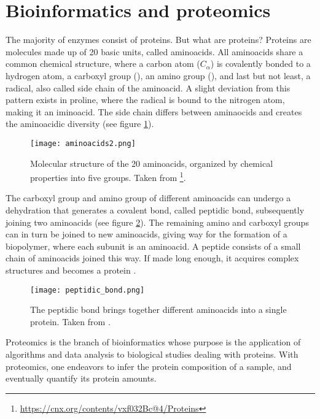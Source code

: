 \section{Bioinformatics and proteomics}

The majority of enzymes consist of proteins. But what are proteins? Proteins are molecules made up of 20 basic units, called aminoacids. All aminoacids share a common chemical structure, where a carbon atom ($C_\alpha$) is covalently bonded to a hydrogen atom, a carboxyl group (), an amino group (), and last but not least, a radical, also called side chain of the aminoacid. A slight deviation from this pattern exists in proline, where the radical is bound to the nitrogen atom, making it an iminoacid. The side chain differs between aminaocids and creates the aminoacidic diversity   (see figure \ref{fig:aminoacids}).

\begin{figure}
  \centering
  \texttt{[image: aminoacids2.png]}
  \caption[The 20 aminoacids]{Molecular structure of the 20 aminoacids, organized by chemical properties into five groups. Taken from \footnote{\href{https://cnx.org/contents/vxf032Bc@4/Proteins}{https://cnx.org/contents/vxf032Bc@4/Proteins}}.}
  \label{fig:aminoacids}
\end{figure}

The carboxyl group and amino group of different aminoacids can undergo a dehydration that generates a covalent bond, called peptidic bond, subsequently joining two aminoacids (see figure \ref{fig:peptidic_bond}). The remaining amino and carboxyl groups can in turn be joined to new aminoacids, giving way for the formation of a biopolymer, where each subunit is an aminoacid. A peptide consists of a small chain of aminoacids joined this way. If made long enough, it acquires complex structures and becomes a protein \cite{Nelson2008}.

\begin{figure}
  \centering
  \texttt{[image: peptidic\_bond.png]}
  \caption[The peptidic bond]{The peptidic bond brings together different aminoacids into a single protein. Taken from \cite{Nelson2008}.}
  \label{fig:peptidic_bond}
\end{figure}


Proteomics is the branch of bioinformatics whose purpose is the application of algorithms and data analysis to biological studies dealing with proteins. With proteomics, one endeavors to infer the protein composition of a sample, and eventually quantify its protein amounts. 

